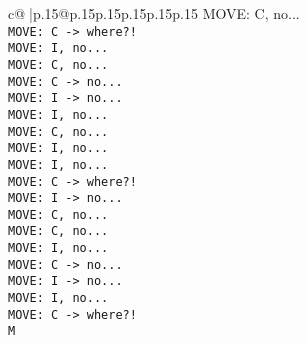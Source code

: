\documentclass{article}
\begin{document}
{\begin{supertabular}{c@{$\;$}|p{.15\linewidth}@{}p{.15\linewidth}p{.15\linewidth}p{.15\linewidth}p{.15\linewidth}p{.15\linewidth}}
{{{MOVE: C, no...\\ \tt  MOVE: C -> where?!\\ \tt  MOVE: I, no...\\ \tt  MOVE: C, no...\\ \tt  MOVE: C -> no...\\ \tt  MOVE: I -> no...\\ \tt  MOVE: I, no...\\ \tt  MOVE: C, no...\\ \tt  MOVE: I, no...\\ \tt  MOVE: I, no...\\ \tt  MOVE: C -> where?!\\ \tt  MOVE: I -> no...\\ \tt  MOVE: C, no...\\ \tt  MOVE: C, no...\\ \tt  MOVE: I, no...\\ \tt  MOVE: C -> no...\\ \tt  MOVE: I -> no...\\ \tt  MOVE: I, no...\\ \tt  MOVE: C -> where?!\\ \tt  M}}}
\end{supertabular}}
\end{document}
